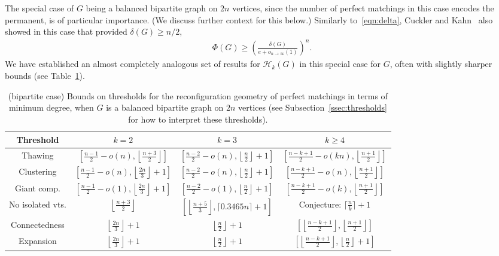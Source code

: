 \documentclass[11pt,a4paper]{article}
\theoremstyle{definition}
\begin{document}
The special case of $G$ being a balanced bipartite graph on $2n$ vertices, since the number of perfect matchings in this case encodes the permanent, is of particular importance.
(We discuss further context for this below.)
Similarly to~\eqref{eqn:delta}, Cuckler and Kahn~\cite{CuKa09a,CuKa09b} also showed in this
case that provided $\delta(G) \ge n/2$,
\begin{align}\label{eqn:bipartite,delta} \Phi(G) \ge
\left(\frac{\delta(G)}{e+o_{n\to\infty}(1)}\right)^n.
\end{align}
We have established an almost completely analogous set of results for $\mathcal H_k(G)$ in this
special case for $G$, often with slightly sharper bounds (see Table~\ref{tab:thresholds_bip}).
\begin{table}
  \centering
  \begin{tabular}{|c|c|c|c|}
    \hline
    {\small Threshold} & $k=2$ & $k=3$ & $k \ge 4$\\
    \hline
    {\small Thawing} & $\left[\frac{n- 1}2- o(n), \left\lfloor\frac{n+3}2\right\rfloor\right]$ & $\left[\frac{n-2}2- o(n), \left\lfloor\frac{n}2\right\rfloor+1\right]$ & $\left[\frac{n-k+1}2- o(kn), \left\lfloor\frac{n+1}2\right\rfloor\right]$ \\
    {\small Clustering} & $\left[\frac{n-1}2-o(n), \left\lfloor
                    \frac{2n}3 \right\rfloor+1\right]$ & $\left[\frac{n-2}2- o(n), \left\lfloor\frac{n}2\right\rfloor+1\right]$ & $\left[\frac{n-k+1}2-o(n), \left\lfloor\frac{n+1}2\right\rfloor\right]$\\
    {\small Giant comp.} & $\left[\frac{n-1}2-o(1), \left\lfloor
                    \frac{2n}3 \right\rfloor+1\right]$ & $\left[\frac{n-2}2-o(1), \left\lfloor\frac{n}2\right\rfloor+1\right]$ & $\left[\frac{n-k+1}2-o(k),\left\lfloor\frac{n+1}2\right\rfloor\right]$ \\
    {\small No isolated vts.}& $\left\lfloor\frac{n+3}2\right\rfloor$ & $\left[\left\lfloor\frac{n+5}3\right\rfloor,\lceil0.3465 n\rceil +1\right]$ & {\small Conjecture:} $\lceil\frac{n}k\rceil +1$
    \\
    {\small Connectedness} & $\left\lfloor \frac{2n}3 \right\rfloor+1$&$\left\lfloor\frac{n}2\right\rfloor+1$ & $\left[\left\lfloor \frac{n-k+1}2 \right\rfloor,\left\lfloor\frac{n+1}2\right\rfloor\right]$ \\
    {\small Expansion} & $\left\lfloor \frac{2n}3 \right\rfloor+1$&$\left\lfloor\frac{n}2\right\rfloor+1$ & $\left[\left\lfloor \frac{n-k+1}2 \right\rfloor,\left\lfloor\frac{n}2\right\rfloor+1\right]$ \\
    \hline
\end{tabular}
    \caption{(bipartite case) Bounds on thresholds for the reconfiguration geometry
      of perfect matchings in terms of minimum degree, when $G$ is a balanced bipartite graph on $2n$ vertices (see
      Subsection~\ref{ssec:thresholds} for how to interpret these thresholds).
      \label{tab:thresholds_bip}}
\end{table}
\end{document}
